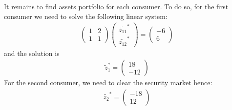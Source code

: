 \documentclass[a4paper]{article}
\begin{document}
It remains to find assets portfolio for each consumer. To do so, for the first consumer we need to solve the following linear system:
\begin{align*}
\begin{pmatrix}
1 & 2\\
1 & 1
\end{pmatrix} \begin{pmatrix}
\tilde{z_{11}}^*\\
\tilde{z_{12}}^*
\end{pmatrix} = \begin{pmatrix}
-6\\
6
\end{pmatrix}
\end{align*}
and the solution is 
\begin{align*}
\tilde{z}_1^* = \begin{pmatrix}
18\\
-12
\end{pmatrix}
\end{align*}
For the second consumer, we need to clear the security market hence:
\begin{align*}
\tilde{z_2}^* = \begin{pmatrix}
-18\\
12
\end{pmatrix}
\end{align*}
\end{document}
